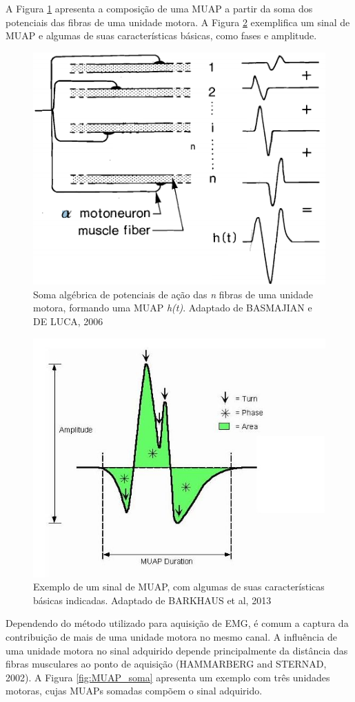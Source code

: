 \documentclass[
	12pt,				%
	openright,			%
	oneside,
	a4paper,			%
	english,			%
	francais,				%
	spanish,			%
	brazil				%
	]{abntex2}
\begin{document}
	A Figura \ref{fig:MUAP_comp} apresenta a composição de uma MUAP a partir da soma dos potenciais das fibras de uma unidade motora. A Figura \ref{fig:MUAP_phases} exemplifica um sinal de MUAP e algumas de suas características básicas, como fases e amplitude.

\begin{figure}
\centering
\includegraphics[width=0.6\linewidth]{../img/MUAP_comp.PNG}
\caption{Soma algébrica de potenciais de ação das \emph{n} fibras de uma unidade motora, formando uma MUAP \emph{h(t)}. Adaptado de BASMAJIAN e DE LUCA, 2006}
\label{fig:MUAP_comp}
\end{figure}

\begin{figure}
\centering
\includegraphics[width=0.6\linewidth]{../img/MUAP_phases.jpg}
\caption{Exemplo de um sinal de MUAP, com algumas de suas características básicas indicadas. Adaptado de BARKHAUS et al, 2013}
\label{fig:MUAP_phases}
\end{figure}
	
	Dependendo do método utilizado para aquisição de EMG, é comum a captura da contribuição de mais de uma unidade motora no mesmo canal. A influência de uma unidade motora no sinal adquirido depende principalmente da distância das fibras musculares ao ponto de aquisição (HAMMARBERG and STERNAD, 2002). A Figura \ref{fig:MUAP_soma} apresenta um exemplo com três unidades motoras, cujas MUAPs somadas compõem o sinal adquirido. 
	
\end{document}
